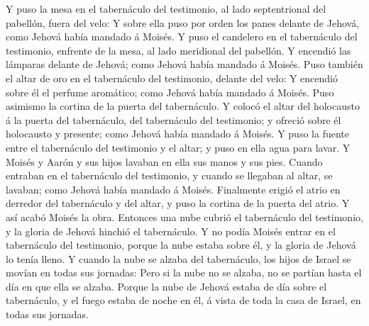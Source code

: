  Y puso la mesa en el tabernáculo del testimonio, al lado
septentrional del pabellón, fuera del velo:  Y sobre ella
puso por orden los panes delante de Jehová, como Jehová había mandado á
Moisés.  Y puso el candelero en el tabernáculo del
testimonio, enfrente de la mesa, al lado meridional del pabellón.
 Y encendió las lámparas delante de Jehová; como Jehová
había mandado á Moisés.  Puso también el altar de oro en el
tabernáculo del testimonio, delante del velo:  Y encendió
sobre él el perfume aromático; como Jehová había mandado á Moisés.
 Puso asimismo la cortina de la puerta del tabernáculo.
 Y colocó el altar del holocausto á la puerta del
tabernáculo, del tabernáculo del testimonio; y ofreció sobre él
holocausto y presente; como Jehová había mandado á Moisés. 
Y puso la fuente entre el tabernáculo del testimonio y el altar; y puso
en ella agua para lavar.  Y Moisés y Aarón y sus hijos
lavaban en ella sus manos y sus pies.  Cuando entraban en
el tabernáculo del testimonio, y cuando se llegaban al altar, se
lavaban; como Jehová había mandado á Moisés.  Finalmente
erigió el atrio en derredor del tabernáculo y del altar, y puso la
cortina de la puerta del atrio. Y así acabó Moisés la obra.
 Entonces una nube cubrió el tabernáculo del testimonio, y
la gloria de Jehová hinchió el tabernáculo.  Y no podía
Moisés entrar en el tabernáculo del testimonio, porque la nube estaba
sobre él, y la gloria de Jehová lo tenía lleno.  Y cuando
la nube se alzaba del tabernáculo, los hijos de Israel se movían en
todas sus jornadas:  Pero si la nube no se alzaba, no se
partían hasta el día en que ella se alzaba.  Porque la nube
de Jehová estaba de día sobre el tabernáculo, y el fuego estaba de noche
en él, á vista de toda la casa de Israel, en todas sus jornadas.
